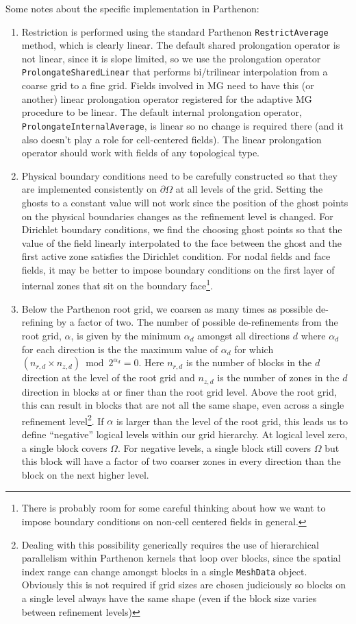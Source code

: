 \documentclass{article}
\begin{document}
Some notes about the specific implementation in Parthenon: 
\begin{enumerate} 
\item Restriction is performed using the standard Parthenon \texttt{RestrictAverage} method, which is clearly linear. The default shared prolongation operator is not linear, since it is slope limited, so we use the prolongation operator \texttt{ProlongateSharedLinear} that performs bi/trilinear interpolation from a coarse grid to a fine grid. Fields involved in MG need to have this (or another) linear prolongation operator registered for the adaptive MG procedure to be linear. The default internal prolongation operator, \texttt{ProlongateInternalAverage}, is linear so no change is required there (and it also doesn't play a role for cell-centered fields). The linear prolongation operator should work with fields of any topological type.
\item Physical boundary conditions need to be carefully constructed so that they are implemented consistently on $\partial \Omega$ at all levels of the grid. Setting the ghosts to a constant value will not work since the position of the ghost points on the physical boundaries changes as the refinement level is changed. For Dirichlet boundary conditions, we find the choosing ghost points so that the value of the field linearly interpolated to the face between the ghost and the first active zone satisfies the Dirichlet condition. For nodal fields and face fields, it may be better to impose boundary conditions on the first layer of internal zones that sit on the boundary face\footnote{There is probably room for some careful thinking about how we want to impose boundary conditions on non-cell centered fields in general.}.
\item Below the Parthenon root grid, we coarsen as many times as possible de-refining by a factor of two. The number of possible de-refinements from the root grid, $\alpha$, is given by the minimum $\alpha_d$ amongst all directions $d$ where $\alpha_d$ for each direction is the the maximum value of $\alpha_d$ for which $(n_{r,d} \times n_{z,d}) \bmod 2^{\alpha_d} = 0$. Here $n_{r,d}$ is the number of blocks in the $d$ direction at the level of the root grid and $n_{z,d}$ is the number of zones in the $d$ direction in blocks at or finer than the root grid level. Above the root grid, this can result in blocks that are not all the same shape, even across a single refinement level\footnote{Dealing with this possibility generically requires the use of hierarchical parallelism within Parthenon kernels that loop over blocks, since the spatial index range can change amongst blocks in a single \texttt{MeshData} object. Obviously this is not required if grid sizes are chosen judiciously so blocks on a single level always have the same shape (even if the block size varies between refinement levels)}. If $\alpha$ is larger than the level of the root grid, this leads us to define ``negative'' logical levels within our grid hierarchy. At logical level zero, a single block covers $\Omega$. For negative levels, a single block still covers $\Omega$ but this block will have a factor of two coarser zones in every direction than the block on the next higher level.
\end{enumerate} 
\end{document}

